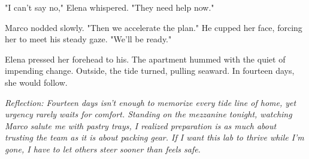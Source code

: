 "I can't say no," Elena whispered. "They need help now."

Marco nodded slowly. "Then we accelerate the plan." He cupped her face, forcing her to meet his steady gaze. "We'll be ready."

Elena pressed her forehead to his. The apartment hummed with the quiet of impending change. Outside, the tide turned, pulling seaward. In fourteen days, she would follow.

\noindent\textit{Reflection: Fourteen days isn't enough to memorize every tide line of home, yet urgency rarely waits for comfort. Standing on the mezzanine tonight, watching Marco salute me with pastry trays, I realized preparation is as much about trusting the team as it is about packing gear. If I want this lab to thrive while I'm gone, I have to let others steer sooner than feels safe.}
